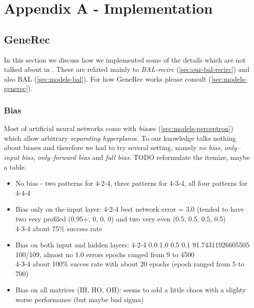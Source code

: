 
\section*{Appendix A - Implementation}
\appendix
{}
\label{sec:appendix-impl} 


\subsection*{GeneRec} 
\label{sec:appendix-impl-generec} 

In this section we discuss how we implemented some of the details which are not talked about in \citet{o1996bio}. These are related mainly to \emph{BAL-recirc} (\ref{sec:our-bal-recirc}) and also BAL (\ref{sec:models-bal}). For how GeneRec works please consult (\ref{sec:models-generec}).  

\subsubsection*{Bias} 

Most of artificial neural networks come with \emph{bias}es (\ref{sec:models-perceptron}) which allow arbitrary \emph{separating hyperplane}s. To our knowledge \citet{o1996bio} talks nothing about biases and therefore we had to try several setting, namely \emph{no bias}, \emph{only--input bias}, \emph{only--forward bias} and \emph{full bias}. TODO reformulate the itemize, maybe a table. 

\begin{itemize} 
\item No bias - two patterns for 4-2-4, three patterns for 4-3-4, all four patterns for 4-4-4
\item Bias only on the input layer:  
4-2-4 best network error = 3.0 (tended to have two very profiled (0.95+, 0, 0, 0) and two very even (0.5, 0.5, 0.5, 0.5)  \\
4-3-4 about 75\% success rate 
\item Bias on both input and hidden layers: 
    4-2-4 0.0 1.0 0.5 0.1 91.74311926605505 100/109, almost no 1.0 errors 
          epochs ranged from 9 to 4500 \\ 
    4-3-4 about 100\% succes rate with about 20 epochs (epoch ranged from 5 to 700) 
\item Bias on all matrices (IH, HO, OH): 
    seems to add a little chaos with a slighty worse performance (but maybe bad sigma)

\end{itemize} 

